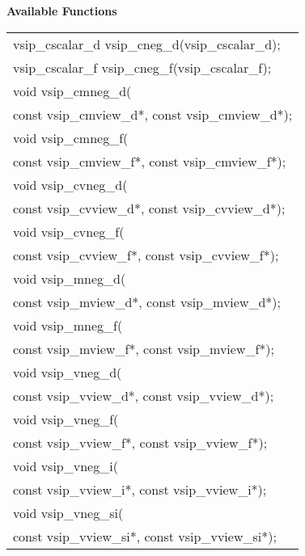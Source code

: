 \cvsiplh
\newline \hspace*{.8cm} \vspace*{.1cm} \textbf{Available Functions }
\newline \hspace*{1.1cm} {
\ttfamily
\begin{tabular}[H]{l}
vsip\_cscalar\_d vsip\_cneg\_d(vsip\_cscalar\_d);\\
vsip\_cscalar\_f vsip\_cneg\_f(vsip\_cscalar\_f);\\
void vsip\_cmneg\_d(\\*\hspace{.6cm}const vsip\_cmview\_d*, const vsip\_cmview\_d*);\\
void vsip\_cmneg\_f(\\*\hspace{.6cm}const vsip\_cmview\_f*, const vsip\_cmview\_f*);\\
void vsip\_cvneg\_d(\\*\hspace{.6cm}const vsip\_cvview\_d*, const vsip\_cvview\_d*);\\
void vsip\_cvneg\_f(\\*\hspace{.6cm}const vsip\_cvview\_f*, const vsip\_cvview\_f*);\\
void vsip\_mneg\_d(\\*\hspace{.6cm}const vsip\_mview\_d*, const vsip\_mview\_d*);\\
void vsip\_mneg\_f(\\*\hspace{.6cm}const vsip\_mview\_f*, const vsip\_mview\_f*);\\
void vsip\_vneg\_d(\\*\hspace{.6cm}const vsip\_vview\_d*, const vsip\_vview\_d*);\\
void vsip\_vneg\_f(\\*\hspace{.6cm}const vsip\_vview\_f*, const vsip\_vview\_f*);\\
void vsip\_vneg\_i(\\*\hspace{.6cm}const vsip\_vview\_i*, const vsip\_vview\_i*);\\
void vsip\_vneg\_si(\\*\hspace{.6cm}const vsip\_vview\_si*, const vsip\_vview\_si*);\\
\end{tabular}
}
\pyjvsiph